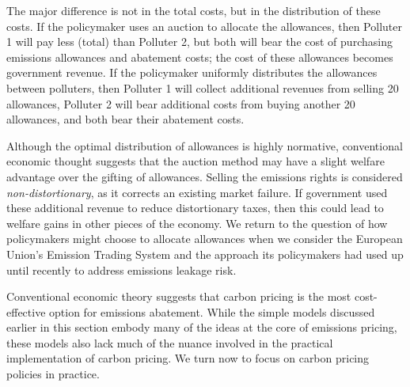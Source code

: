 The major difference is not in the total costs, but in the distribution of these costs. If the policymaker uses an auction to allocate the allowances, then Polluter 1 will pay less (total) than Polluter 2, but both will bear the cost of purchasing emissions allowances and abatement costs; the cost of these allowances becomes government revenue. If the policymaker uniformly distributes the allowances between polluters, then Polluter 1 will collect additional revenues from selling 20 allowances, Polluter 2 will bear additional costs from buying another 20 allowances, and both bear their abatement costs. 

Although the optimal distribution of allowances is highly normative, conventional economic thought suggests that the auction method may have a slight welfare advantage over the gifting of allowances. Selling the emissions rights is considered \emph{non-distortionary}, as it corrects an existing market failure. If government used these additional revenue to reduce distortionary taxes, then this could lead to welfare gains in other pieces of the economy. We return to the question of how policymakers might choose to allocate allowances when we consider the European Union's Emission Trading System and the approach its policymakers had used up until recently to address emissions leakage risk.

Conventional economic theory suggests that carbon pricing is the most  cost-effective option for emissions abatement. While the simple models discussed earlier in this section embody many of the ideas at the core of emissions pricing, these models also lack much of the nuance involved in the practical implementation of carbon pricing. We turn now to focus on carbon pricing policies in practice. 

